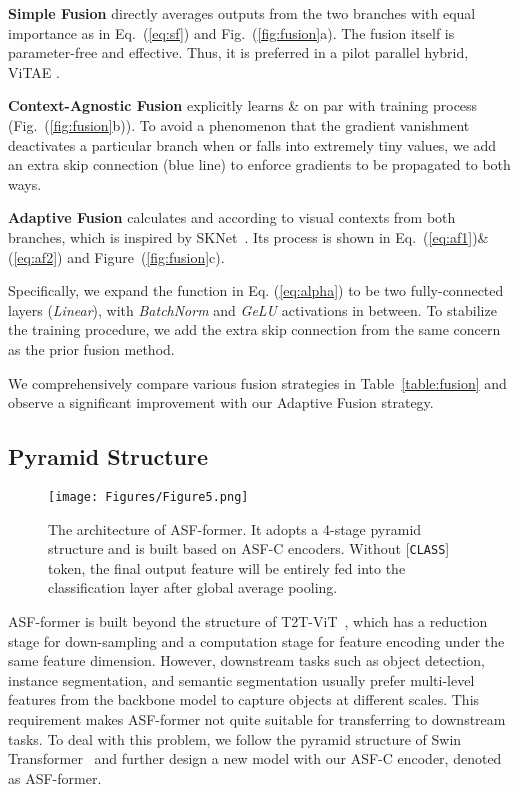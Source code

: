\documentclass[lettersize,journal]{IEEEtran}
\begin{document}
\textbf{Simple Fusion} directly averages outputs from the two branches with equal importance as in Eq.~(\ref{eq:sf}) and Fig.~(\ref{fig:fusion}a). The fusion itself is parameter-free and effective. Thus, it is preferred in a pilot parallel hybrid, ViTAE \cite{Xu2021ViTAEVT}. 


\textbf{Context-Agnostic Fusion} explicitly learns  \&  on par with training process (Fig.~(\ref{fig:fusion}b)). To avoid a phenomenon that the gradient vanishment deactivates a particular branch when  or  falls into extremely tiny values, we add an extra skip connection ({\color{blue}blue} line) to enforce gradients to be propagated to both ways.


\textbf{Adaptive Fusion} calculates  and  according to visual contexts from both branches, which is inspired by SKNet~\cite{Li2019SelectiveKN}. Its process is shown in Eq.~(\ref{eq:af1})\&(\ref{eq:af2}) and Figure~(\ref{fig:fusion}c).  


Specifically, we expand the function  in Eq. (\ref{eq:alpha}) to be two fully-connected layers (\textit{Linear}), with \textit{BatchNorm} and \textit{GeLU} activations in between. To stabilize the training procedure, we add the extra skip connection from the same concern as the prior fusion method.

We comprehensively compare various fusion strategies in Table~\ref{table:fusion} and observe a significant improvement with our Adaptive Fusion strategy.

\subsection{Pyramid Structure}
\label{pyramid}

\begin{figure*}
\centering
\texttt{[image: Figures/Figure5.png]}
\caption{The architecture of ASF-former. It adopts a 4-stage pyramid structure and is built based on ASF-C encoders. Without [{\tt CLASS}] token, the final output feature will be entirely fed into the classification layer after global average pooling.}
\label{fig:pyramid}
\end{figure*}

ASF-former is built beyond the structure of T2T-ViT~\cite{yuan2021tokens}, which has a reduction stage for down-sampling and a computation stage for feature encoding under the same feature dimension. However, downstream tasks such as object detection, instance segmentation, and semantic segmentation usually prefer multi-level features from the backbone model to capture objects at different scales. This requirement makes ASF-former not quite suitable for transferring to downstream tasks. To deal with this problem, we follow the pyramid structure of Swin Transformer~\cite{liu2021Swin} and further design a new model with our ASF-C encoder, denoted as ASF-former.
\end{document}
